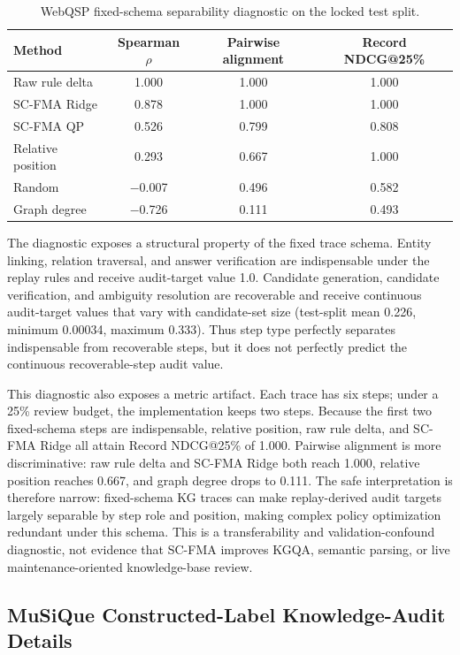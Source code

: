 \documentclass[a4paper,fleqn]{cas-sc}
\begin{document}
\begin{table}[ht]
\caption{WebQSP fixed-schema separability diagnostic on the locked test split.}
\label{tab:supp-webqsp-diagnostic}
\centering
\small
\begin{tabular}{lccc}
\toprule
\textbf{Method} & \textbf{Spearman $\rho$} & \textbf{Pairwise alignment} & \textbf{Record NDCG@25\%} \\
\midrule
Raw rule delta & 1.000 & 1.000 & 1.000 \\
SC-FMA Ridge & 0.878 & 1.000 & 1.000 \\
SC-FMA QP & 0.526 & 0.799 & 0.808 \\
Relative position & 0.293 & 0.667 & 1.000 \\
Random & $-$0.007 & 0.496 & 0.582 \\
Graph degree & $-$0.726 & 0.111 & 0.493 \\
\bottomrule
\end{tabular}
\end{table}

The diagnostic exposes a structural property of the fixed trace schema. Entity linking, relation traversal, and answer verification are indispensable under the replay rules and receive audit-target value 1.0. Candidate generation, candidate verification, and ambiguity resolution are recoverable and receive continuous audit-target values that vary with candidate-set size (test-split mean 0.226, minimum 0.00034, maximum 0.333). Thus step type perfectly separates indispensable from recoverable steps, but it does not perfectly predict the continuous recoverable-step audit value.

This diagnostic also exposes a metric artifact. Each trace has six steps; under a 25\% review budget, the implementation keeps two steps. Because the first two fixed-schema steps are indispensable, relative position, raw rule delta, and SC-FMA Ridge all attain Record NDCG@25\% of 1.000. Pairwise alignment is more discriminative: raw rule delta and SC-FMA Ridge both reach 1.000, relative position reaches 0.667, and graph degree drops to 0.111. The safe interpretation is therefore narrow: fixed-schema KG traces can make replay-derived audit targets largely separable by step role and position, making complex policy optimization redundant under this schema. This is a transferability and validation-confound diagnostic, not evidence that SC-FMA improves KGQA, semantic parsing, or live maintenance-oriented knowledge-base review.

\subsection{MuSiQue Constructed-Label Knowledge-Audit Details}
\label{app:musique-knowledge-audit}
\end{document}
